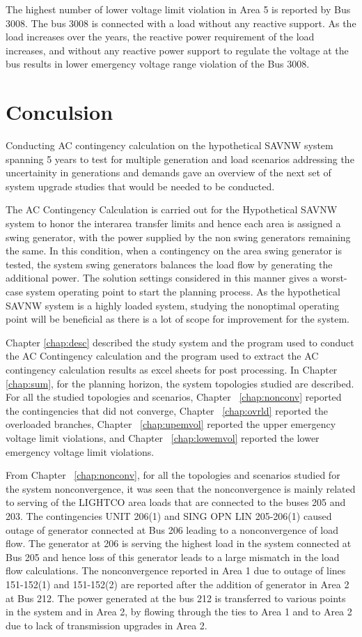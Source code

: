 \documentclass[10pt]{report}
\begin{document}
The highest number of lower voltage limit violation in Area 5 is reported by Bus 3008. The bus 3008 is connected with a load without any reactive support. As the load increases over the years, the reactive power requirement of the load increases, and without any reactive power support to regulate the voltage at the bus results in lower emergency voltage range violation of the Bus 3008. 


\chapter{Conculsion}
\label{conclusion} 
Conducting AC contingency calculation on the hypothetical SAVNW system spanning 5 years to test for multiple generation and load scenarios addressing the uncertainity in generations and demands gave an overview of the next set of system upgrade studies that would be needed to be conducted. 

The AC Contingency Calculation is carried out for the Hypothetical SAVNW system to honor the interarea transfer limits and hence each area is assigned a swing generator, with the power supplied by the non swing generators remaining the same. In this condition, when a contingency on the area swing generator is tested, the system swing generators balances the load flow by generating the additional power. The solution settings considered in this manner gives a worst-case system operating point to start the planning process. As the hypothetical SAVNW system is a highly loaded system, studying the nonoptimal operating point will be beneficial as there is a lot of scope for improvement for the system. 

Chapter \ref{chap:desc} described the study system and the program used to conduct the AC Contingency calculation and the program used to extract the AC contingency calculation results as excel sheets for post processing. In Chapter \ref{chap:sum}, for the planning horizon, the system topologies studied are described. For all the studied topologies and scenarios, Chapter ~\ref{chap:nonconv} reported the contingencies that did not converge, Chapter ~\ref{chap:ovrld} reported the overloaded branches, Chapter ~\ref{chap:upemvol} reported the upper emergency voltage limit violations, and Chapter ~\ref{chap:lowemvol} reported the lower emergency voltage limit violations.  

From Chapter ~\ref{chap:nonconv}, for all the topologies and scenarios studied for the system nonconvergence, it was seen that the nonconvergence is mainly related to serving of the LIGHTCO area loads that are connected to the buses 205 and 203. The contingencies UNIT 206(1) and SING OPN LIN 205-206(1) caused outage of generator connected at Bus 206 leading to a nonconvergence of load flow. The generator at 206 is serving the highest load in the system connected at Bus 205 and hence loss of this generator leads to a large mismatch in the load flow calculations. The nonconvergence reported in Area 1 due to outage of lines 151-152(1) and 151-152(2) are reported after the addition of generator in Area 2 at Bus 212. The power generated at the bus 212 is transferred to various points in the system and in Area 2, by flowing through the ties to Area 1 and to Area 2 due to lack of transmission upgrades in Area 2. 
\end{document}
